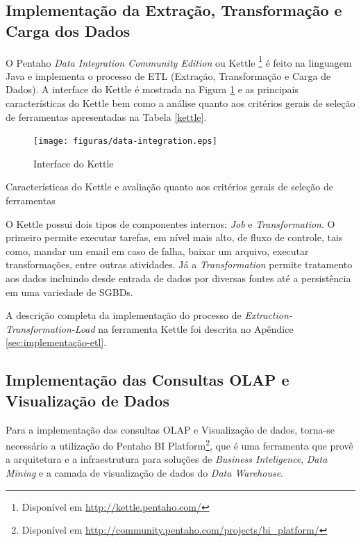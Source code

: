 \subsection{Implementação da Extração, Transformação e Carga dos Dados}
\label{implementação-ETL}
O Pentaho \textit{Data Integration Community Edition} ou Kettle \footnote{Disponível em \url{http://kettle.pentaho.com/}} é feito na linguagem Java e implementa o processo de ETL (Extração, Transformação e Carga de Dados). A interface do Kettle é mostrada na Figura \ref{pdi} e as principais características do Kettle bem como a análise quanto aos critérios gerais de seleção de ferramentas apresentadas na Tabela \ref{kettle}.


\begin{figure}[ht!]
\centering
\texttt{[image: figuras/data-integration.eps]}
\caption{Interface do Kettle}
\label{pdi}
\end{figure}
\FloatBarrier
 

\begin{table}[!ht]

\caption{Características do Kettle e avaliação quanto aos critérios gerais de seleção de ferramentas}
\label{kettle}
\end{table}
\FloatBarrier	

O Kettle possui dois tipos de componentes internos: \textit{Job} e \textit{Transformation}. O primeiro permite executar tarefas, em nível mais alto, de fluxo de controle, tais como, mandar um email em caso de falha, baixar um arquivo, executar transformações, entre outras atividades. Já a \textit{Transformation} permite tratamento aos dados incluindo desde entrada de dados por diversas fontes até a persistência em uma variedade de SGBDs.


A descrição completa da implementação do processo de \textit{Extraction-Transformation-Load} na ferramenta Kettle foi descrita no Apêndice \ref{sec:implementação-etl}.

\subsection{Implementação das Consultas OLAP e Visualização de Dados}

Para a implementação das consultas OLAP e Visualização de dados, torna-se necessário a utilização do Pentaho BI Platform\footnote{Disponível em \url{http://community.pentaho.com/projects/bi_platform/}}, que é uma ferramenta que provê a arquitetura e a infraestrutura para soluções de \textit{Business Inteligence}, \textit{Data Mining} e a camada de visualização de dados do \textit{Data Warehouse}.


